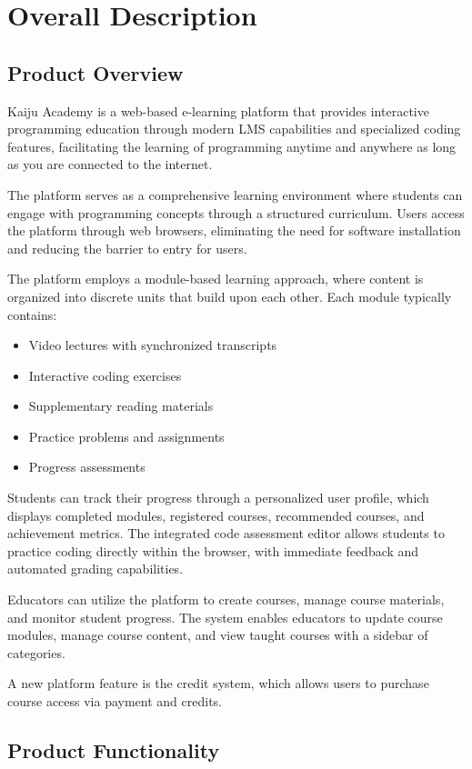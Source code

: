 \documentclass[a4paper, 11pt]{scrreprt}
\begin{document}
\chapter{Overall Description}
\section{Product Overview}
Kaiju Academy is a web-based e-learning platform that provides interactive programming education through modern LMS capabilities and specialized coding features, facilitating the learning of programming anytime and anywhere as long as you are connected to the internet.

The platform serves as a comprehensive learning environment where students can engage with programming concepts through a structured curriculum. Users access the platform through web browsers, eliminating the need for software installation and reducing the barrier to entry for users.

The platform employs a module-based learning approach, where content is organized into discrete units that build upon each other. Each module typically contains:

\begin{itemize}
    \item Video lectures with synchronized transcripts
    \item Interactive coding exercises
    \item Supplementary reading materials
    \item Practice problems and assignments
    \item Progress assessments
\end{itemize}

Students can track their progress through a personalized user profile, which displays completed modules, registered courses, recommended courses, and achievement metrics. The integrated code assessment editor allows students to practice coding directly within the browser, with immediate feedback and automated grading capabilities.

Educators can utilize the platform to create courses, manage course materials, and monitor student progress. The system enables educators to update course modules, manage course content, and view taught courses with a sidebar of categories.

A new platform feature is the credit system, which allows users to purchase course access via payment and credits.

\section{Product Functionality}
\end{document}
